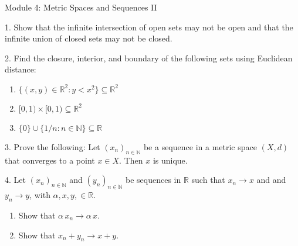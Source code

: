 \documentclass{article}
\theoremstyle{remark} %
\newcommand{\R}{{\mathbb{R}}}
\newcommand{\N}{{\mathbb{N}}}
\begin{document}
\begin{center}
\Large{Module 4: Metric Spaces and Sequences II}
\end{center}

1. Show that the infinite intersection of open sets may not be open and that the infinite union of closed sets may not be closed.
\vspace{9.5cm} %



2.  Find the closure, interior, and boundary of the following sets using Euclidean distance:
    \begin{enumerate}
        \item[(i)] $\{(x,y)\in \R^2 : y < x^2 \} \subseteq \R^2$
        \item[(ii)]  $[0,1)\times[0,1) \subseteq \R^2$
        \item[(iii)] $\{0 \} \cup  \{1/n \colon n \in \N\} \subseteq \R$ 
    \end{enumerate}

\vspace{10cm} %




3. Prove the following: Let $(x_n)_{n\in\N}$ be a sequence in a metric space $(X,d)$ that converges to a point $x \in X$. Then $x$ is unique.

\vspace{11cm} %



4. Let $(x_n)_{n \in \N}$ and $(y_n)_{n \in \N}$ be sequences in $\R$ such that $x_n \to x$ and and $y_n \to y$, with $\alpha, x,y, \in \R$. 
    \begin{enumerate}
        \item[(i)] Show that $\alpha \, x_n \to \alpha \, x$.
        \item[(i)] Show that $x_n + y_n \to x + y$.
    \end{enumerate}

\vspace{11cm} %

\end{document}

